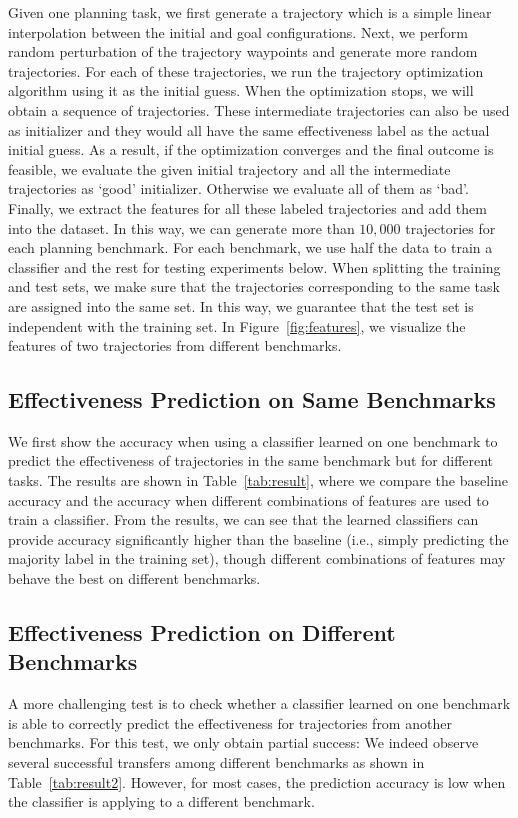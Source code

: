\documentclass[letterpaper, 10 pt, conference]{ieeeconf}  %
\begin{document}
Given one planning task, we first generate a trajectory which is a simple linear interpolation between the initial and goal configurations. Next, we perform random perturbation of the trajectory waypoints and generate more random trajectories. For each of these trajectories, we run the trajectory optimization algorithm using it as the initial guess. When the optimization stops, we will obtain a sequence of trajectories. These intermediate trajectories can also be used as initializer and they would all have the same effectiveness label as the actual initial guess. As a result, if the optimization converges and the final outcome is feasible, we evaluate the given initial trajectory and all the intermediate trajectories as `good' initializer. Otherwise we evaluate all of them as `bad'. Finally, we extract the features for all these labeled trajectories and add them into the dataset. In this way, we can generate more than $10,000$ trajectories for each planning benchmark. For each benchmark, we use half the data to train a classifier and the rest for testing experiments below. When splitting the training and test sets, we make sure that the trajectories corresponding to the same task are assigned into the same set. In this way, we guarantee that the test set is independent with the training set.
In Figure~\ref{fig:features}, we visualize the features of two trajectories from different benchmarks.

\subsection{Effectiveness Prediction on Same Benchmarks}
We first show the accuracy when using a classifier learned on one benchmark to predict the effectiveness of trajectories in the same benchmark but for different tasks. The results are shown in Table~\ref{tab:result}, where we compare the baseline accuracy and the accuracy when different combinations of features are used to train a classifier. From the results, we can see that the learned classifiers can provide accuracy significantly higher than the baseline (i.e., simply predicting the majority label in the training set), though different combinations of features may behave the best on different benchmarks.



\subsection{Effectiveness Prediction on Different Benchmarks}
A more challenging test is to check whether a classifier learned on one benchmark is able to correctly predict the effectiveness for trajectories from another benchmarks. For this test, we only obtain partial success: We indeed observe several successful transfers among different benchmarks as shown in Table~\ref{tab:result2}. However, for most cases, the prediction accuracy is low when the classifier is applying to a different benchmark.
\end{document}
